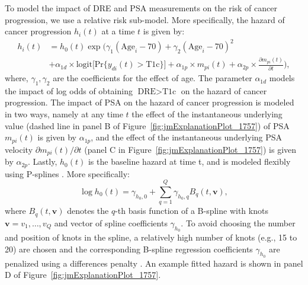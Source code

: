 To model the impact of DRE and PSA measurements on the risk of cancer progression, we use a relative risk sub-model. More specifically, the hazard of cancer progression $h_i(t)$ at a time $t$ is given by:
\begin{equation}
\label{eq:rel_risk_model}
\begin{split}
    h_i(t) &= h_0(t) \exp\Big(\gamma_1 (\mbox{Age}_i-70) + \gamma_2 (\mbox{Age}_i-70)^2\\
    &+\alpha_{1d} \times \mbox{logit} \big[\mbox{Pr}\{y_{di}(t) > \mbox{T1c}\}\big]+ \alpha_{1p} \times m_{pi}(t) + \alpha_{2p} \times \frac{\partial m_{pi}(t)}{\partial {t}}\Big),
    \end{split}
\end{equation}
where, $\gamma_1, \gamma_2$ are the coefficients for the effect of age. The parameter $\alpha_{1d}$ models the impact of log odds of obtaining $\mbox{DRE} > \mbox{T1c}$ on the hazard of cancer progression. The impact of PSA on the hazard of cancer progression is modeled in two ways, namely at any time $t$ the effect of the instantaneous underlying value (dashed line in panel B of Figure~\ref{fig:jmExplanationPlot_1757}) of PSA $m_{pi}(t)$ is given by $\alpha_{1p}$, and the effect of the instantaneous underlying PSA velocity $\partial m_{pi}(t)/\partial {t}$ (panel C in Figure~\ref{fig:jmExplanationPlot_1757}) is given by $\alpha_{2p}$. Lastly, $h_0(t)$ is the baseline hazard at time t, and is modeled flexibly using P-splines \citep{eilers1996flexible}. More specifically:
\begin{equation*}
\log{h_0(t)} = \gamma_{h_0,0} + \sum_{q=1}^Q \gamma_{h_0,q} B_q(t, \boldsymbol{v}),
\end{equation*}
where $B_q(t, \boldsymbol{v})$ denotes the $q$-th basis function of a B-spline with knots $\boldsymbol{v} = v_1, \ldots, v_Q$ and vector of spline coefficients $\gamma_{h_0}$. To avoid choosing the number and position of knots in the spline, a relatively high number of knots (e.g., 15 to 20) are chosen and the corresponding B-spline regression coefficients $\gamma_{h_0}$ are penalized using a differences penalty \citep{eilers1996flexible}. An example fitted hazard is shown in panel D of Figure~\ref{fig:jmExplanationPlot_1757}.  

